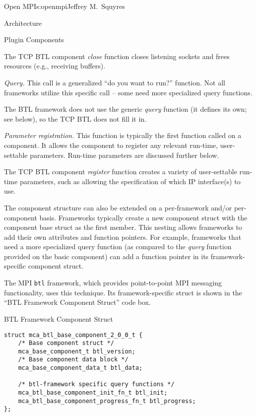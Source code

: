 \begin{aosachapter}{Open MPI}{s:openmpi}{Jeffrey M.\ Squyres}
\begin{aosasect1}{Architecture}
\begin{aosasect2}{Plugin Components}
\begin{aosaitemize}
  The TCP BTL component \emph{close} function closes listening sockets
  and frees resources (e.g., receiving buffers).

\item \emph{Query.} This call is a generalized ``do you want to run?''
  function.  Not all frameworks utilize this specific call -- some
  need more specialized query functions.

  The BTL framework does not use the generic \emph{query} function (it
  defines its own; see below), so the TCP BTL does not fill it in.

\item \emph{Parameter registration.} This function is typically the
  first function called on a component.  It allows the component to
  register any relevant run-time, user-settable parameters.  Run-time
  parameters are discussed further below.

  The TCP BTL component \emph{register} function creates a variety of
  user-settable run-time parameters, such as allowing the
  specification of which IP interface(s) to use.
\end{aosaitemize}

The component structure can also be extended on a per-framework and/or
per-component basis.  Frameworks typically create a new component
struct with the component base struct as the first member.
%
This nesting allows frameworks to add their own attributes and
function pointers.  
%
For example, frameworks that need a more specialized query function
(as compared to the \emph{query} function provided on the basic
component) can add a function pointer in its framework-specific
component struct.

The MPI {\tt btl} framework, which provides point-to-point MPI
messaging functionality, uses this technique.  Its framework-specific
struct is shown in the ``BTL Framework Component Struct'' code box.

\begin{aosabox}{BTL Framework Component Struct}
\begin{verbatim}
struct mca_btl_base_component_2_0_0_t {
    /* Base component struct */
    mca_base_component_t btl_version;
    /* Base component data block */
    mca_base_component_data_t btl_data;

    /* btl-framework specific query functions */
    mca_btl_base_component_init_fn_t btl_init;
    mca_btl_base_component_progress_fn_t btl_progress;
};
\end{verbatim}
\end{aosabox}


\end{aosasect2}
\end{aosasect1}
\end{aosachapter}
